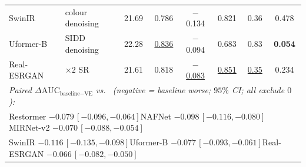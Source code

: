 \begin{table}[!ht]
\begin{tabular}{l l c c c c c c}
SwinIR \citep{liang2021swinir}         & colour denoising& 21.69 & 0.786 & \cellcolor{red!22}$-$0.134 & 0.821 & 0.36 & 0.478 \\
Uformer-B \citep{wang2022uformer}      & SIDD denoising  & 22.28 & \underline{0.836} & \cellcolor{red!16}$-$0.094 & 0.683 & 0.83 & \textbf{0.054} \\
Real-ESRGAN \citep{wang2021realesrgan} & $\times2$ SR    & 21.61 & 0.818 & \cellcolor{red!12}\underline{$-$0.083} & \underline{0.851} & \underline{0.35} & 0.234 \\
\midrule
\multicolumn{8}{l}{\textit{Paired $\Delta\mathrm{AUC}_{\text{baseline}-\text{VE}}$ vs.\ \visienhance{} (negative = baseline worse; $95\%$ CI; all exclude $0$):}}\\
\multicolumn{8}{l}{\;\; Restormer $-0.079\,[-0.096,-0.064]$\quad NAFNet $-0.098\,[-0.116,-0.080]$\quad MIRNet-v2 $-0.070\,[-0.088,-0.054]$}\\
\multicolumn{8}{l}{\;\; SwinIR $-0.116\,[-0.135,-0.098]$\quad Uformer-B $-0.077\,[-0.093,-0.061]$\quad Real-ESRGAN $-0.066\,[-0.082,-0.050]$}\\
\bottomrule
\end{tabular}
\end{table}
